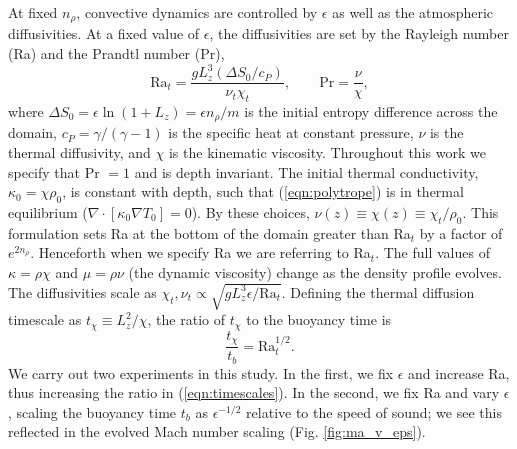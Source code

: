 \documentclass[aps, prfluids, onecolumn, notitlepage, nofootinbib, groupedaddress, amsfonts, amssymb, amsmath]{revtex4-1}
\newcommand{\grad}{\ensuremath{\nabla}}
\begin{document}
At fixed $n_\rho$, convective dynamics are 
controlled by $\epsilon$ as well as the atmospheric diffusivities.
At a fixed value of
$\epsilon$, the diffusivities are set by the
Rayleigh number (Ra) and the Prandtl number (Pr),
\begin{equation}
\text{Ra}_{t} = \frac{g L_z^3 (\Delta S_0 / c_P)}{\nu_t\chi_t},
\qquad
\text{Pr} = \frac{\nu}{\chi},
\end{equation}
where $\Delta S_0 = \epsilon\ln (1 + L_z) = \epsilon n_\rho / m$ 
is the initial entropy difference across the domain,
$c_P = \gamma/(\gamma-1)$ is the specific heat at
constant pressure, $\nu$ is the thermal diffusivity, 
and $\chi$ is the kinematic viscosity.
Throughout this work we specify
that Pr $= 1$ and is depth invariant.
The initial thermal
conductivity, $\kappa_0 = \chi \rho_0$, is
constant with depth, such that (\ref{eqn:polytrope}) is in
thermal equilibrium ($\grad\cdot[\kappa_0\grad T_0] = 0$).
By these
choices, $\nu(z) \equiv \chi(z) \equiv \chi_t / \rho_0$.
This formulation 
sets Ra at the bottom of the domain greater than
Ra$_t$ by a factor of $e^{2n_\rho}$. Henceforth
when we specify Ra we are referring to Ra$_t$.  
The full values of $\kappa = \rho\chi$ and 
$\mu = \rho\nu$ (the dynamic viscosity) change as the density 
profile evolves.  
The diffusivities scale as
$\chi_t, \nu_t \propto \sqrt{g L_z^3 \epsilon / \text{Ra}_t}$.
Defining the thermal diffusion timescale as $t_\chi \equiv L_z^2 / \chi$, the
ratio of $t_\chi$ to the buoyancy time is
\begin{equation}
\frac{t_\chi}{t_b} =\text{Ra}_t^{1/2}.
\label{eqn:timescales}
\end{equation}
We carry out two experiments in this study. In the first,
we fix $\epsilon$ and increase Ra, thus increasing the ratio in
(\ref{eqn:timescales}). In the second, we fix Ra and vary $\epsilon$,
scaling the buoyancy time $t_b$ as $\epsilon^{-1/2}$
relative to the speed of sound; we see this reflected in the evolved Mach
number scaling (Fig. \ref{fig:ma_v_eps}).
\end{document}
